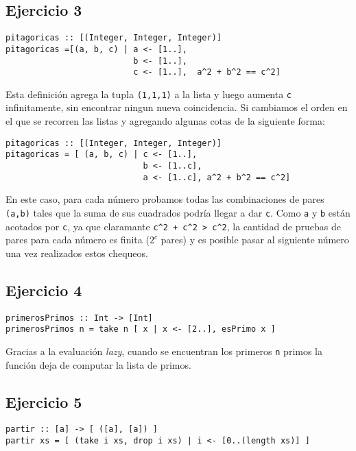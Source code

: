 \documentclass[10pt,a4paper]{article}
\begin{document}
\subsection{Ejercicio 3}
\begin{centrado}
\begin{verbatim}
pitagoricas :: [(Integer, Integer, Integer)]
pitagoricas =[(a, b, c) | a <- [1..], 
                          b <- [1..], 
                          c <- [1..],  a^2 + b^2 == c^2]
\end{verbatim}
\end{centrado}

Esta definición agrega la tupla \texttt{(1,1,1)} a la lista y luego aumenta \texttt{c} infinitamente, sin encontrar ningun nueva coincidencia. Si cambiamos el orden en el que se recorren las listas y agregando algunas cotas de la siguiente forma:
\begin{centrado}
\begin{verbatim}
pitagoricas :: [(Integer, Integer, Integer)]
pitagoricas = [ (a, b, c) | c <- [1..], 
                            b <- [1..c],
                            a <- [1..c], a^2 + b^2 == c^2]
\end{verbatim}
\end{centrado}
En este caso, para cada número probamos todas las combinaciones de pares \texttt{(a,b)} tales que la suma de sus cuadrados podría llegar a dar \texttt{c}. Como \texttt{a} y \texttt{b} están acotados por \texttt{c}, ya que claramante \texttt{c^2 + c^2 > c^2}, la cantidad de pruebas de pares para cada número es finita ($2^c$ pares) y es posible pasar al siguiente número una vez realizados estos chequeos.


\subsection{Ejercicio 4}
\begin{centrado}
\begin{verbatim}
primerosPrimos :: Int -> [Int]
primerosPrimos n = take n [ x | x <- [2..], esPrimo x ]
\end{verbatim}
\end{centrado}

Gracias a la evaluación \textit{lazy}, cuando se encuentran los primeros \texttt{n} primos la función deja de computar la lista de primos.

\subsection{Ejercicio 5}
\begin{centrado}
	\begin{verbatim}
partir :: [a] -> [ ([a], [a]) ]
partir xs = [ (take i xs, drop i xs) | i <- [0..(length xs)] ]
	\end{verbatim}
\end{centrado}
\end{document}

